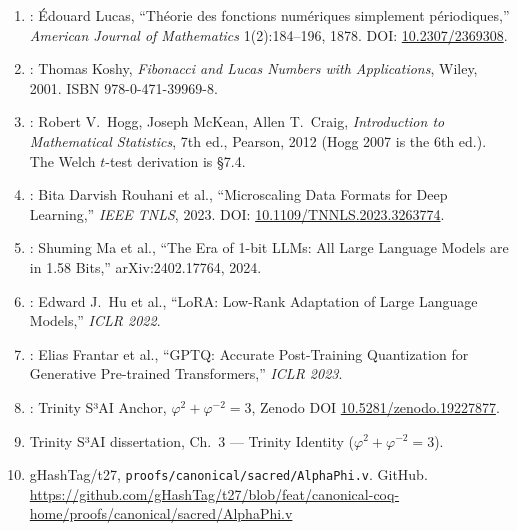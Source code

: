 \begin{enumerate}
  \item \citet{lucas1878theorie}: \'{E}douard Lucas,
        ``Théorie des fonctions numériques simplement
        périodiques,'' \emph{American Journal of
        Mathematics} 1(2):184--196, 1878.
        DOI: \href{https://doi.org/10.2307/2369308}{10.2307/2369308}.

  \item \citet{koshy2001fibonacci}: Thomas Koshy,
        \emph{Fibonacci and Lucas Numbers with Applications},
        Wiley, 2001. ISBN 978-0-471-39969-8.

  \item \citet{hogg2007data}: Robert V.\ Hogg, Joseph
        McKean, Allen T.\ Craig,
        \emph{Introduction to Mathematical Statistics},
        7th ed., Pearson, 2012 (Hogg 2007 is the 6th ed.).
        The Welch $t$-test derivation is §7.4.

  \item \citet{rouhani2023microscaling}: Bita Darvish
        Rouhani et al., ``Microscaling Data Formats for
        Deep Learning,'' \emph{IEEE TNLS}, 2023.
        DOI: \href{https://doi.org/10.1109/TNNLS.2023.3263774}{10.1109/TNNLS.2023.3263774}.

  \item \citet{ma2024era}: Shuming Ma et al., ``The Era of
        1-bit LLMs: All Large Language Models are in 1.58
        Bits,'' arXiv:2402.17764, 2024.

  \item \citet{hu2022lora}: Edward J.\ Hu et al., ``LoRA:
        Low-Rank Adaptation of Large Language Models,''
        \emph{ICLR 2022}.

  \item \citet{frantar2022gptq}: Elias Frantar et al.,
        ``GPTQ: Accurate Post-Training Quantization for
        Generative Pre-trained Transformers,'' \emph{ICLR 2023}.

  \item \citet{zenodo_trinity_anchor_2026}: Trinity S³AI
        Anchor, $\varphi^2 + \varphi^{-2} = 3$,
        Zenodo DOI \href{https://doi.org/10.5281/zenodo.19227877}{10.5281/zenodo.19227877}.

  \item Trinity S³AI dissertation, Ch.~3 --- Trinity
        Identity ($\varphi^2 + \varphi^{-2} = 3$).

  \item gHashTag/t27, \texttt{proofs/canonical/sacred/AlphaPhi.v}.
        GitHub.
        \url{https://github.com/gHashTag/t27/blob/feat/canonical-coq-home/proofs/canonical/sacred/AlphaPhi.v}


\end{enumerate}
